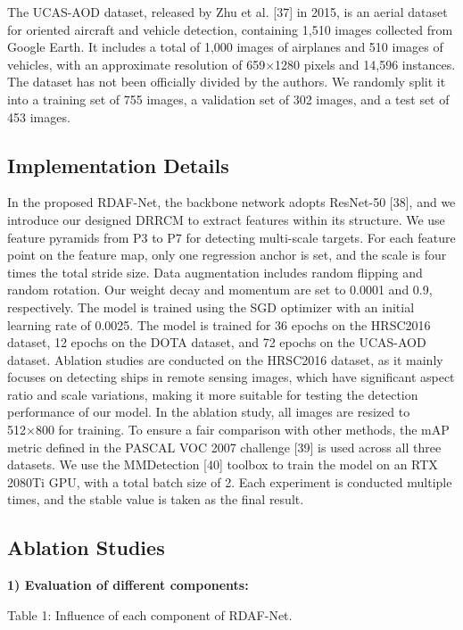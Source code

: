 \documentclass[journal]{IEEEtran}
\begin{document}
The UCAS-AOD dataset, released by Zhu et al. [37] in 2015, is an aerial dataset for oriented aircraft and vehicle detection, containing 1,510 images collected from Google Earth. It includes a total of 1,000 images of airplanes and 510 images of vehicles, with an approximate resolution of 659×1280 pixels and 14,596 instances. The dataset has not been officially divided by the authors. We randomly split it into a training set of 755 images, a validation set of 302 images, and a test set of 453 images.

\subsection{ Implementation Details }

In the proposed RDAF-Net, the backbone network adopts ResNet-50 [38], and we introduce our designed DRRCM to extract features within its structure. We use feature pyramids from P3 to P7 for detecting multi-scale targets. For each feature point on the feature map, only one regression anchor is set, and the scale is four times the total stride size. Data augmentation includes random flipping and random rotation. Our weight decay and momentum are set to 0.0001 and 0.9, respectively. The model is trained using the SGD optimizer with an initial learning rate of 0.0025. The model is trained for 36 epochs on the HRSC2016 dataset, 12 epochs on the DOTA dataset, and 72 epochs on the UCAS-AOD dataset. Ablation studies are conducted on the HRSC2016 dataset, as it mainly focuses on detecting ships in remote sensing images, which have significant aspect ratio and scale variations, making it more suitable for testing the detection performance of our model. In the ablation study, all images are resized to 512×800 for training. To ensure a fair comparison with other methods, the mAP metric defined in the PASCAL VOC 2007 challenge [39] is used across all three datasets. We use the MMDetection [40] toolbox to train the model on an RTX 2080Ti GPU, with a total batch size of 2. Each experiment is conducted multiple times, and the stable value is taken as the final result.

\subsection{ Ablation Studies }

\textbf{1) Evaluation of different components:}

Table 1: Influence of each component of RDAF-Net.
\end{document}
